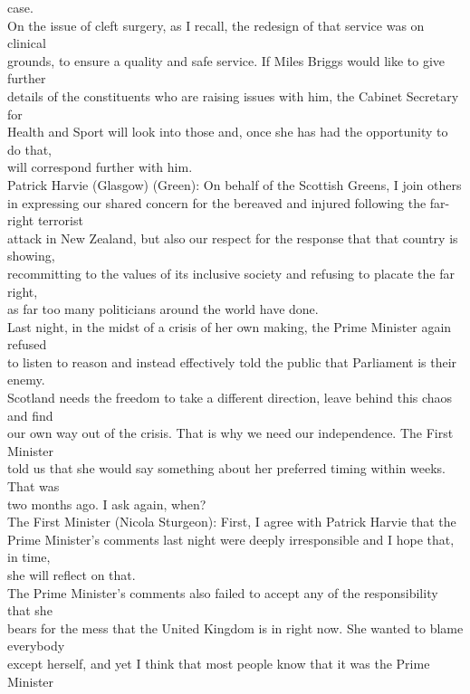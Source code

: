 \documentclass{article}
\begin{document}
\begin{description}
{case.\\
On the issue of cleft surgery, as I recall, the redesign of that service was on clinical\\
grounds, to ensure a quality and safe service. If Miles Briggs would like to give further\\
details of the constituents who are raising issues with him, the Cabinet Secretary for\\
Health and Sport will look into those and, once she has had the opportunity to do that,\\
will correspond further with him.\\
Patrick Harvie (Glasgow) (Green): On behalf of the Scottish Greens, I join others\\
in expressing our shared concern for the bereaved and injured following the far-right terrorist\\
attack in New Zealand, but also our respect for the response that that country is showing,\\
recommitting to the values of its inclusive society and refusing to placate the far right,\\
as far too many politicians around the world have done.\\
Last night, in the midst of a crisis of her own making, the Prime Minister again refused\\
to listen to reason and instead effectively told the public that Parliament is their enemy.\\
Scotland needs the freedom to take a different direction, leave behind this chaos and find\\
our own way out of the crisis. That is why we need our independence. The First Minister\\
told us that she would say something about her preferred timing within weeks. That was\\
two months ago. I ask again, when?\\
The First Minister (Nicola Sturgeon): First, I agree with Patrick Harvie that the\\
Prime Minister’s comments last night were deeply irresponsible and I hope that, in time,\\
she will reflect on that.\\
The Prime Minister’s comments also failed to accept any of the responsibility that she\\
bears for the mess that the United Kingdom is in right now. She wanted to blame everybody\\
except herself, and yet I think that most people know that it was the Prime Minister\\
}
\end{description}
\end{document}
